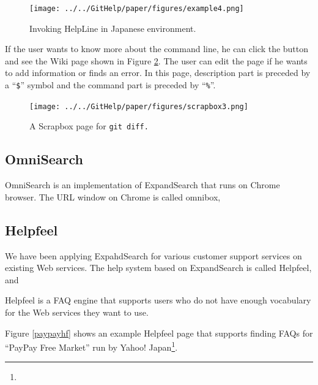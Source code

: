 \documentclass[manuscript,screen,review]{acmart}
\def\HL{\textsf{HelpLine}}
\def\HF{\textsf{Helpfeel}}
\def\ES{\textsf{ExpandSearch}}
\def\SB{\textsf{Scrapbox}}
\begin{document}
\begin{figure}[t]
  \texttt{[image: ../../GitHelp/paper/figures/example4.png]}
  \caption{Invoking {\HL} in Japanese environment.}
  \label{example3}
\end{figure}

If the user wants to know more about the command line,
he can click the
button and see the Wiki page shown in Figure \ref{scrapboxpage}.
The user can edit the page if he wants to add information or finds an error.
In this page, description part is preceded by a ``\texttt{\$}'' symbol and
the command part is preceded by ``\texttt{\%}''.

\begin{figure}[t]
  \centerline{\texttt{[image: ../../GitHelp/paper/figures/scrapbox3.png]}}
  \caption{A {\SB} page for \tt{git diff}.}
  \label{scrapboxpage}
\end{figure}


\subsection{OmniSearch}

OmniSearch is an implementation of {\ES} that runs on Chrome browser.
The URL window on Chrome is called omnibox, 

\subsection{Helpfeel}

We have been applying ExpahdSearch for various customer support services on existing Web services.
The help system based on {\ES} is called {\HF}, and

{\HF} is a FAQ engine that supports users who do not have enough vocabulary for the Web services they want to use.


Figure \ref{paypayhf} shows an example {\HF} page that supports finding FAQs
for ``PayPay Free Market'' run by Yahoo! Japan\footnote{
}.

\end{document}
